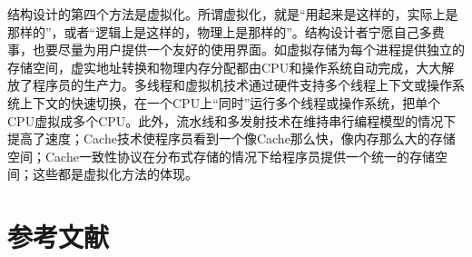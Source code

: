 \documentclass[]{ctexbook}
\begin{document}
结构设计的第四个方法是虚拟化。所谓虚拟化，就是``用起来是这样的，实际上是那样的''，或者``逻辑上是这样的，物理上是那样的''。结构设计者宁愿自己多费事，也要尽量为用户提供一个友好的使用界面。如虚拟存储为每个进程提供独立的存储空间，虚实地址转换和物理内存分配都由CPU和操作系统自动完成，大大解放了程序员的生产力。多线程和虚拟机技术通过硬件支持多个线程上下文或操作系统上下文的快速切换，在一个CPU上``同时''运行多个线程或操作系统，把单个CPU虚拟成多个CPU。此外，流水线和多发射技术在维持串行编程模型的情况下提高了速度；Cache技术使程序员看到一个像Cache那么快，像内存那么大的存储空间；Cache一致性协议在分布式存储的情况下给程序员提供一个统一的存储空间；这些都是虚拟化方法的体现。

\newpage

\hypertarget{references}{%
\chapter*{参考文献}\label{references}}


\end{document}
